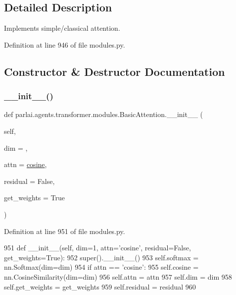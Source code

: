 \subsection{Detailed Description}
\begin{DoxyVerb}Implements simple/classical attention.
\end{DoxyVerb}
 

Definition at line 946 of file modules.\+py.



\subsection{Constructor \& Destructor Documentation}
\mbox{\label{classparlai_1_1agents_1_1transformer_1_1modules_1_1BasicAttention_afa25129ca6ce9851053205f44f090fd6}} 
\subsubsection{\texorpdfstring{\+\_\+\+\_\+init\+\_\+\+\_\+()}{\_\_init\_\_()}}
{\footnotesize\ttfamily def parlai.\+agents.\+transformer.\+modules.\+Basic\+Attention.\+\_\+\+\_\+init\+\_\+\+\_\+ (\begin{DoxyParamCaption}\item[{}]{self,  }\item[{}]{dim = {},  }\item[{}]{attn = {\ttfamily \textquotesingle{}\hyperlink{classparlai_1_1agents_1_1transformer_1_1modules_1_1BasicAttention_abed26e42fa2293f14cbbcf51c090794c}{cosine}\textquotesingle{}},  }\item[{}]{residual = {\ttfamily False},  }\item[{}]{get\+\_\+weights = {\ttfamily True} }\end{DoxyParamCaption})}



Definition at line 951 of file modules.\+py.


\begin{DoxyCode}
951     \textcolor{keyword}{def }\_\_init\_\_(self, dim=1, attn='cosine', residual=False, get\_weights=True):
952         super().\_\_init\_\_()
953         self.softmax = nn.Softmax(dim=dim)
954         \textcolor{keywordflow}{if} attn == \textcolor{stringliteral}{'cosine'}:
955             self.cosine = nn.CosineSimilarity(dim=dim)
956         self.attn = attn
957         self.dim = dim
958         self.get\_weights = get\_weights
959         self.residual = residual
960 
\end{DoxyCode}


